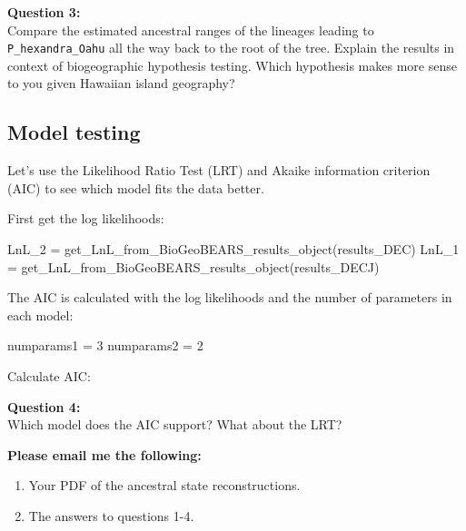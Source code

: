 \documentclass[11pt]{article}
\begin{document}
\begin{framed}
\noindent
\textbf{Question 3:} \\
Compare the estimated ancestral ranges of the lineages
leading to \texttt{P\_hexandra\_Oahu} all the way back to the root
of the tree.
Explain the results in context of biogeographic hypothesis
testing. Which hypothesis makes more sense to you given Hawaiian island geography?
\end{framed}

\subsection{Model testing}

Let's use 
the Likelihood Ratio Test (LRT) and
Akaike information criterion (AIC)
to see which model fits the data better.

First get the log likelihoods:
\begin{code}
LnL_2 = get_LnL_from_BioGeoBEARS_results_object(results_DEC)
LnL_1 = get_LnL_from_BioGeoBEARS_results_object(results_DECJ)
\end{code}
The AIC is calculated with the log likelihoods and the number
of parameters in each model:
\begin{code}
numparams1 = 3
numparams2 = 2
\end{code}
Calculate AIC:

\begin{framed}
\noindent
\textbf{Question 4:} \\
Which model does the AIC support?
What about the LRT?
\end{framed}

\begin{framed}
\noindent
\textbf{Please email me the following:}
\begin{enumerate}
  \item Your PDF of the ancestral state reconstructions.
  \item The answers to questions 1-4.
\end{enumerate}
\end{framed}


 
\end{document}
